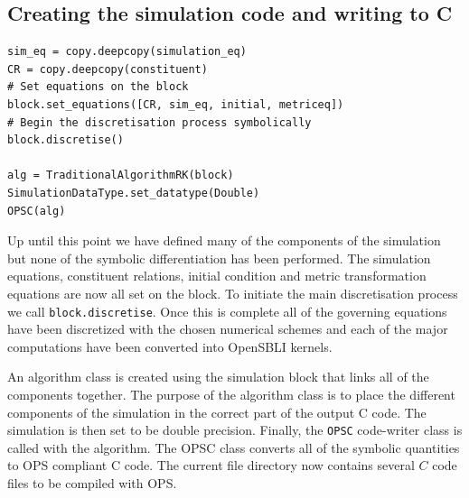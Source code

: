 \documentclass[11pt]{article}
\begin{document}
\subsection{Creating the simulation code and writing to C}
\begin{lstlisting}
sim_eq = copy.deepcopy(simulation_eq)
CR = copy.deepcopy(constituent)
# Set equations on the block
block.set_equations([CR, sim_eq, initial, metriceq])
# Begin the discretisation process symbolically
block.discretise()

alg = TraditionalAlgorithmRK(block)
SimulationDataType.set_datatype(Double)
OPSC(alg)
\end{lstlisting}
Up until this point we have defined many of the components of the simulation but none of the symbolic differentiation has been performed. The simulation equations, constituent relations, initial condition and metric transformation equations are now all set on the block. To initiate the main discretisation process we call \verb|block.discretise|. Once this is complete all of the governing equations have been discretized with the chosen numerical schemes and each of the major computations have been converted into OpenSBLI kernels.

An algorithm class is created using the simulation block that links all of the components together. The purpose of the algorithm class is to place the different components of the simulation in the correct part of the output C code. The simulation is then set to be double precision. Finally, the \verb|OPSC| code-writer class is called with the algorithm. The OPSC class converts all of the symbolic quantities to OPS compliant C code. The current file directory now contains several $C$ code files to be compiled with OPS.
\end{document}
